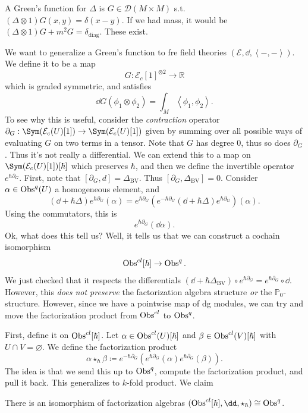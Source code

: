 A Green's function for $\Delta $ is $G\in \mathcal{D} (M\times M)$ s.t. $(\Delta \otimes 1)G(x,y) = \delta (x-y)$. If we had mass, it would be $(\Delta \otimes 1)G+m^2G = \delta _{\mathrm{diag } } $. These exist.

We want to generalize a Green's function to fre field theories $(\mathcal{E} ,\dd ,\left\langle -,- \right\rangle )$. We define it to be a map
\[
	G : \mathcal{E} _c[1]^{\otimes 2}  \to \mathbb{R} 
\]
which is graded symmetric, and satisfies
\[
	\dd G(\phi _1\otimes \phi _2)=\int_{M} \left\langle \phi_1,\phi _2 \right\rangle 
.\]
To see why this is useful, consider the \emph{contraction} operator $\partial _G : \Sym (\mathcal{E} _c(U)[1]) \to \Sym (\mathcal{E} _c(U)[1])$ given by summing over all possible ways of evaluating $G$ on two terms in a tensor. Note that $G$ has degree 0, thus so does $\partial _G$. Thus it's not really a differential. We can extend this to a map on $\Sym (\mathcal{E} _c(U)[1])[\hbar ]$ which preserves $\hbar $, and then we define the invertible operator $e^{\hbar \partial _G} $. First, note that $[\partial _G,d]=\Delta _{\mathrm{BV} } $. Thus $[\partial _G,\Delta _{\mathrm{BV} } ]=0$. Consider $\alpha \in\operatorname{Obs}^{q} (U)$ a homogeneous element, and
\[
	(\dd +\hbar \Delta )e^{\hbar \partial _G} (\alpha )=e^{\hbar \partial _G} \left( e^{-\hbar \partial _G} \left( \dd +\hbar \Delta  \right) e^{\hbar \partial _G}  \right) (\alpha )
.\]
Using the commutators, this is
\[
	e^{\hbar \partial _G} (\dd \alpha )
.\]
Ok, what does this tell us? Well, it tells us that we can construct a cochain isomorphism
\[
	\operatorname{Obs}^{cl}[\hbar ] \to \operatorname{Obs}^q
.\]
We just checked that it respects the differentials $(\dd +\hbar \Delta_{\mathrm{BV} } )\circ e^{\hbar \partial _G} =e^{\hbar \partial _G} \circ \dd $. However, this \emph{does not preserve} the factorization algebra structure \emph{or} the $\mathbb{P} _0$-structure. However, since we have a pointwise map of dg modules, we can try and move the factorization product from $\operatorname{Obs}^{cl} $ to $\operatorname{Obs}^q$.

First, define it on $\operatorname{Obs}^{cl} [\hbar ]$. Let $\alpha \in\operatorname{Obs}^{cl} (U)[\hbar ]$ and $\beta \in\operatorname{Obs}^{cl} (V)[\hbar ]$ with $U \cap V=\varnothing $. We define the factorization product
\[
	\alpha \star _\hbar \beta \coloneqq e^{-\hbar \partial _G} \left( e^{\hbar \partial _G} (\alpha )e^{\hbar \partial _G} (\beta ) \right) 
.\]
The idea is that we send this up to $\operatorname{Obs}^q$, compute the factorization product, and pull it back. This generalizes to $k$-fold product. We claim
\begin{theorem}\label{?}
	There is an isomorphism of factorization algebras $(\Obs^{cl} [\hbar ],\dd ,\star _\hbar )\cong \Obs^q$.
\end{theorem}

